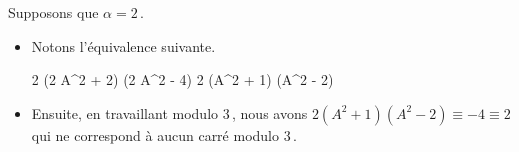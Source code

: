 \medskip

	Supposons que $\alpha = 2$\,.
%
\begin{itemize}
	\item Notons l'équivalence suivante.
    
    \medskip
    \noindent\kern-10pt%
    \begin{stepcalc}[style=ar*, ope=\iff]
    	2 (2 A^2 + 2) (2 A^2 - 4) \in \NNssquare
    	2 (A^2 + 1) (A^2 - 2) \in \NNssquare
    \end{stepcalc}

	\item Ensuite, en travaillant modulo $3$\,, nous avons
	$2 (A^2 + 1) (A^2 - 2) \equiv -4 \equiv 2$ qui ne correspond à aucun carré modulo $3$\,.
	\qedhere 
\end{itemize}